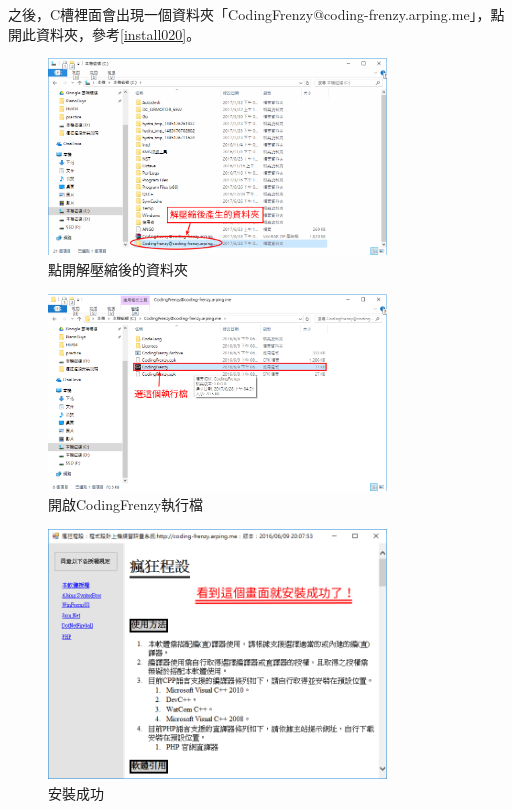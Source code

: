 		\newpage
		之後，C槽裡面會出現一個資料夾「CodingFrenzy@coding-frenzy.arping.me」，點開此資料夾，參考\autoref{install020}。
		\begin{figure}[H]
			\centering
			\includegraphics[width=0.8\textwidth]{fig/install_and_setting/install_020}
			\caption{點開解壓縮後的資料夾}
			\label{install020}
		\end{figure}
		\begin{figure}[H]
			\centering
			\includegraphics[width=0.8\textwidth]{fig/install_and_setting/install_021}
			\caption{開啟CodingFrenzy執行檔}
		\end{figure}
		\begin{figure}[H]
			\centering
			\includegraphics[width=0.8\textwidth]{fig/install_and_setting/install_022}
			\caption{安裝成功}
		\end{figure}

